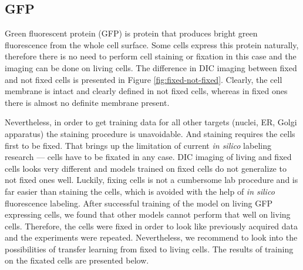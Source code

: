 \subsection{GFP}
    \label{section:gfp}
    Green fluorescent protein (GFP) is protein that produces bright green fluorescence from the whole cell surface. Some cells express this protein naturally, therefore there is no need to perform cell staining or fixation in this case and the imaging can be done on living cells. The difference in DIC imaging between fixed and not fixed cells is presented in Figure \ref{fig:fixed-not-fixed}. Clearly, the cell membrane is intact and clearly defined in not fixed cells, whereas in fixed ones there is almost no definite membrane present. 
    
    Nevertheless, in order to get training data for all other targets (nuclei, ER, Golgi apparatus) the staining procedure is unavoidable. And staining requires the cells first to be fixed. That brings up the limitation of current \textit{in silico} labeling research --- cells have to be fixated in any case. DIC imaging of living and fixed cells looks very different and models trained on fixed cells do not generalize to not fixed ones well. Luckily, fixing cells is not a cumbersome lab procedure and is far easier than staining the cells, which is avoided with the help of \textit{in silico} fluorescence labeling. After successful training of the model on living GFP expressing cells, we found that other models cannot perform that well on living cells. Therefore, the cells were fixed in order to look like previously acquired data and the experiments were repeated. Nevertheless, we recommend to look into the possibilities of transfer learning from fixed to living cells. The results of training on the fixated cells are presented below. 
    
